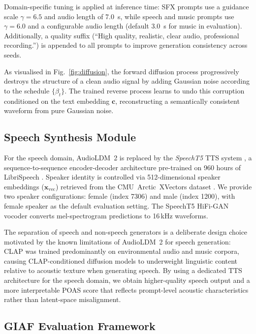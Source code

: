 \documentclass[journal]{IEEEtran}
\begin{document}
Domain-specific tuning is applied at inference time: SFX prompts use
a guidance scale $\gamma = 6.5$ and audio length of 7.0~s, while
speech and music prompts use $\gamma = 6.0$ and a configurable audio
length (default 3.0~s for music in evaluation). Additionally, a quality
suffix (``High quality, realistic, clear audio, professional
recording.'') is appended to all prompts to improve generation
consistency across seeds.

As visualised in Fig.~\ref{fig:diffusion}, the forward diffusion process
progressively destroys the structure of a clean audio signal by adding
Gaussian noise according to the schedule $\{\beta_t\}$. The trained
reverse process learns to undo this corruption conditioned on the text
embedding $\mathbf{c}$, reconstructing a semantically consistent
waveform from pure Gaussian noise.

\subsection{Speech Synthesis Module}

For the speech domain, AudioLDM~2 is replaced by the \textit{SpeechT5}
TTS system \cite{ao2021speecht5}, a sequence-to-sequence encoder-decoder
architecture pre-trained on 960 hours of LibriSpeech \cite{panayotov2015librispeech}.
Speaker identity is controlled via 512-dimensional speaker embeddings
($\mathbf{x}_{\text{vec}}$) retrieved from the CMU~Arctic~XVectors
dataset \cite{veaux2017cstr}. We provide two speaker configurations:
female (index 7306) and male (index 1200), with female speaker as the
default evaluation setting. The SpeechT5 HiFi-GAN vocoder converts
mel-spectrogram predictions to 16\,kHz waveforms.

The separation of speech and non-speech generators is a deliberate
design choice motivated by the known limitations of AudioLDM~2 for
speech generation: CLAP was trained predominantly on environmental audio
and music corpora, causing CLAP-conditioned diffusion models to underweight
linguistic content relative to acoustic texture when generating speech.
By using a dedicated TTS architecture for the speech domain, we obtain
higher-quality speech output and a more interpretable POAS score that
reflects prompt-level acoustic characteristics rather than latent-space
misalignment.

\subsection{GIAF Evaluation Framework}
\label{sec:giaf}
\end{document}
